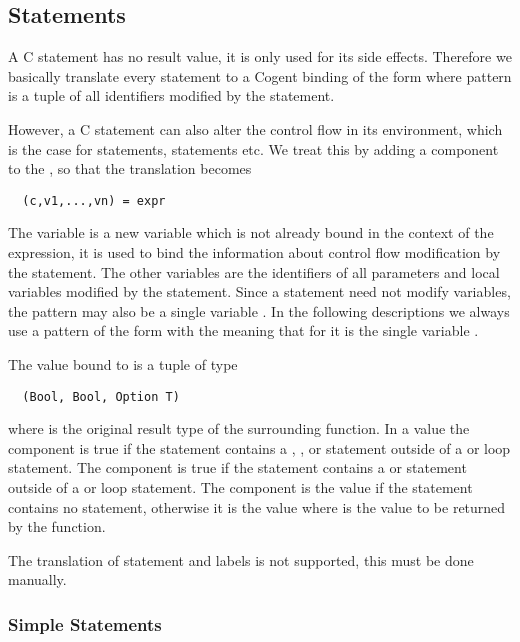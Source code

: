 \subsection{Statements}
\label{app-transfunction-stat}

A C statement has no result value, it is only used for its side effects. Therefore we basically translate every
statement to a Cogent binding of the form  where pattern is a tuple of all identifiers
modified by the statement.

However, a C statement can also alter the control flow in its environment, which is the case for 
 statements,  statements etc. We treat this by adding a 
component to the , so that the translation becomes
\begin{verbatim}
  (c,v1,...,vn) = expr
\end{verbatim}
The variable  is a
new variable which is not already bound in the context of the expression, it is used to bind the information about 
control flow modification by the statement. The other variables are the identifiers of all parameters and local 
variables modified by the statement. Since a statement need not modify variables, the pattern may also be
a single variable . In the following descriptions we always use a pattern of the form 
with the meaning that for  it is the single variable .

The value bound to  is a tuple of type 
\begin{verbatim}
  (Bool, Bool, Option T)
\end{verbatim}
where  is the original result type of the surrounding function. In a value  the component
 is true if the statement contains a , , or  statement outside
of a  or loop statement. The component  is true if the statement contains a 
or  statement outside of a  or loop statement. The component  is the value 
 if the statement contains no  statement, otherwise it is the value  where
 is the value to be returned by the function.

The translation of  statement and labels is not supported, this must be done manually.

\subsubsection{Simple Statements}

